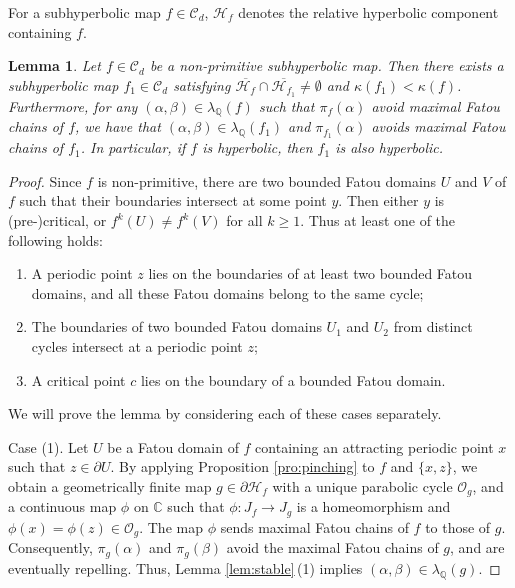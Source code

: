 \documentclass[a4paper,reqno,times, 11pt]{amsart}
\newtheorem{lemma}[theorem]{Lemma}
\theoremstyle{remark}
\theoremstyle{plain}
\numberwithin{equation}{section}
\def\OOO{{\cal O}}
\def\HHHH{\mathscr H}
\def\CCCC{\mathscr C}
\def\C{\mbox{$\mathbb C$}}
\def\Q{\mathbb Q}
\def\cal{\mathcal}
\def\ov{\overline}
\begin{document}
For a subhyperbolic map $f\in\CCCC_d$,
$\HHHH_{f}$ denotes the relative hyperbolic component containing $f$.

\begin{lemma}\label{lem:reduce}
	Let  $f\in\CCCC_d$ be a non-primitive subhyperbolic map. Then there exists a subhyperbolic map $ f_1\in\CCCC_d$ satisfying
	$\ov{\HHHH_{f}}\cap\ov{\HHHH_{f_1}}\not=\emptyset$ and $\kappa(f_1)<\kappa(f)$. Furthermore,
	for any $(\alpha,\beta)\in\lambda_\Q(f)$ such that $\pi_f(\alpha)$ avoid  maximal Fatou chains of $f$,  we have that $(\alpha,\beta)\in\lambda_\Q(f_1)$ and $\pi_{f_1}(\alpha)$  avoids maximal Fatou chains of $f_1$.
	In particular, if $f$ is hyperbolic, then $f_1$ is also hyperbolic.
\end{lemma}
\begin{proof}
	Since $f$ is non-primitive, there are two bounded Fatou domains $U$ and $V$ of $f$ such that their boundaries intersect at some point $y$. Then either $y$ is (pre-)critical, or $f^k(U) \neq f^k(V)$ for all $k \geq 1$. Thus at least one of the following holds:
	\begin{enumerate}
		\item A periodic point $z$ lies on the boundaries of at least two bounded Fatou domains, and all these Fatou domains belong to the same cycle;
		
		\item The boundaries of two bounded Fatou domains $U_1$ and $U_2$ from distinct cycles intersect at a periodic point $z$;
		
		\item A critical point $c$ lies on the boundary of a bounded Fatou domain.
	\end{enumerate}
	We will prove the lemma by considering each of these cases separately.\vspace{3pt}
	
	Case (1). Let $U$ be a Fatou domain of $f$ containing an attracting periodic point $x$ such that $z \in \partial U$. By applying Proposition
	\ref{pro:pinching} to $f$ and $\{x,z\}$, we obtain a geometrically finite map $g\in\partial \HHHH_f$ with a unique parabolic cycle $\OOO_g$, and a continuous  map $\phi$ on $\C$ such that $\phi:J_f\to J_g$ is a homeomorphism and $\phi(x)=\phi(z)\in\OOO_g$.
	The map $\phi$ sends maximal Fatou chains of $f$ to those of $g$. Consequently, $\pi_g(\alpha)$ and $\pi_g(\beta)$ avoid the maximal Fatou chains of $g$, and are eventually repelling. Thus, Lemma \ref{lem:stable}\,(1) implies $(\alpha,\beta)\in\lambda_\Q(g)$.
	

\end{proof}
\end{document}
